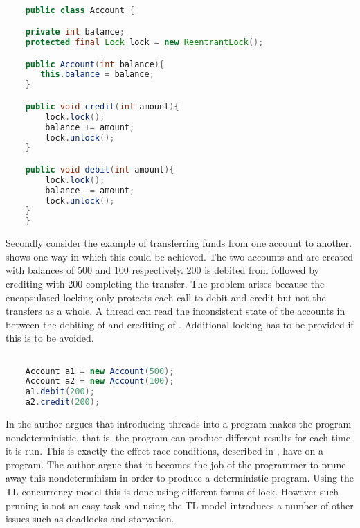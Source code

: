 \begin{lstlisting}[float,label=lst:account_example,
  caption={Encapsulated locking},
  language=Java,  
  showspaces=false,
  showtabs=false,
  breaklines=true,
  showstringspaces=false,
  breakatwhitespace=true,
  commentstyle=\color{greencomments},
  keywordstyle=\color{bluekeywords},
  stringstyle=\color{redstrings}]  % Start your code-block

	public class Account {

    private int balance;
    protected final Lock lock = new ReentrantLock();

    public Account(int balance){
       this.balance = balance;
    }

    public void credit(int amount){
        lock.lock();
        balance += amount;
        lock.unlock();
    }

    public void debit(int amount){
        lock.lock();
        balance -= amount;
        lock.unlock();
    }
	}
\end{lstlisting}

Secondly consider the example of transferring funds from one account to another.  shows one way in which this could be achieved. The two accounts  and  are created with balances of 500 and 100 respectively. 200 is debited from  followed by crediting  with 200 completing the transfer. The problem arises because the encapsulated locking only protects each call to debit and credit but not the transfers as a whole\cite[p. 59]{sutter2005software}. A thread can read the inconsistent state of the accounts in between the debiting of  and crediting of . Additional locking has to be provided  if this is to be avoided.

\begin{lstlisting}[float,label=lst:account_example_transfer,
  caption={Funds transfer between two accounts},
  language=Java,  
  showspaces=false,
  showtabs=false,
  breaklines=true,
  showstringspaces=false,
  breakatwhitespace=true,
  commentstyle=\color{greencomments},
  keywordstyle=\color{bluekeywords},
  stringstyle=\color{redstrings}]  % Start your code-block

    Account a1 = new Account(500);
    Account a2 = new Account(100);
    a1.debit(200);
    a2.credit(200);
\end{lstlisting}

In \cite{lee2006problem} the author argues that introducing threads into a program makes the program nondeterministic, that is, the program can produce different results for each time it is run. This is exactly the effect race conditions, described in , have on a program. The author argue that it becomes the job of the programmer to prune away this nondeterminism in order to produce a deterministic program. Using the \ac{TL} concurrency model this is done using different forms of lock. However such pruning is not an easy task and using the \ac{TL} model introduces a number of other issues such as deadlocks and starvation.

